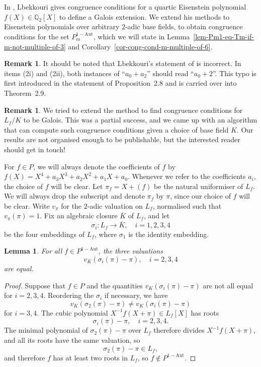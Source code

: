 \documentclass[11pt]{amsart}
\theoremstyle{theorem}
\newtheorem{lemma}[theorem]{Lemma}
\theoremstyle{example}
\theoremstyle{definition}
\newtheorem{remark}[theorem]{Remark}
\numberwithin{theorem}{section}
\numberwithin{theorem}{section}
\newcommand{\Q}{\mathbb{Q}}
\newcommand{\oneaut}{\mathrm{1-Aut}}
\begin{document}
In \cite[Theorem~2.9]{lbekkouri}, Lbekkouri gives congruence conditions for a quartic Eisenstein polynomial $f(X) \in \Q_2[X]$ to define a Galois extension. We extend his methods to Eisenstein polynomials over arbitrary $2$-adic base fields, to obtain congruence conditions for the set $P_m^{\oneaut}$, which we will state in Lemma~\ref{lem-Pm1-eq-Tm-if-m-not-multiple-of-3} and Corollary~\ref{cor-cong-cond-m-multiple-of-6}.
\begin{remark}
    It should be noted that Lbekkouri's statement of \cite[Theorem~2.9]{lbekkouri} is incorrect. In items (2i) and (2ii), both instances of ``$a_0 + a_2$'' should read ``$a_0 + 2$''. This typo is first introduced in the statement of Proposition~2.8 and is carried over into Theorem~2.9. 
\end{remark}
\begin{remark}
    We tried to extend the method to find congruence conditions for $L_f/K$ to be Galois. This was a partial success, and we came up with an algorithm that can compute such congruence conditions given a choice of base field $K$. Our results are not organised enough to be publishable, but the interested reader should get in touch! 
\end{remark}


For $f \in P$, we will always denote the coefficients of $f$ by $f(X) = X^4 + a_3X^3 + a_2X^2 + a_1X + a_0$. Whenever we refer to the coefficients $a_i$, the choice of $f$ will be clear. Let $\pi_f = X + (f)$ be the natural uniformiser of $L_f$. We will always drop the subscript and denote $\pi_f$ by $\pi$, since our choice of $f$ will be clear. Write $v_\pi$ for the $2$-adic valuation on $L_f$, normalised such that $v_\pi(\pi) = 1$. Fix an algebraic closure $\overline{K}$ of $L_f$, and let 
$$
\sigma_i : L_f \to \overline{K},\quad i=1,2,3,4
$$
be the four embeddings of $L_f$, where $\sigma_1$ is the identity embedding. 
\begin{lemma}
    \label{lem-1-aut-implies-eq-vals}
    For all $f \in P^{\oneaut}$, the three valuations 
    $$
    v_K(\sigma_i(\pi) - \pi),\quad i=2,3,4
    $$
    are equal. 
\end{lemma}
\begin{proof}
    Suppose that $f \in P$ and the quantities $v_K(\sigma_i(\pi) - \pi)$ are not all equal for $i=2,3,4$. Reordering the $\sigma_i$ if necessary, we have 
    $$
    v_K(\sigma_2(\pi) - \pi) \neq v_K(\sigma_i(\pi) - \pi)
    $$
    for $i = 3,4$. The cubic polynomial $X^{-1}f(X+\pi) \in L_f[X]$ has roots
    $$
    \sigma_i(\pi) - \pi,\quad i = 2,3,4.
    $$
    The minimal polynomial of $\sigma_2(\pi) - \pi$ over $L_f$ therefore divides $X^{-1}f(X+\pi)$, and all its roots have the same valuation, so 
    $$
    \sigma_2(\pi) - \pi \in L_f,
    $$
    and therefore $f$ has at least two roots in $L_f$, so $f \not \in P^{\oneaut}$.
\end{proof}
\end{document}
